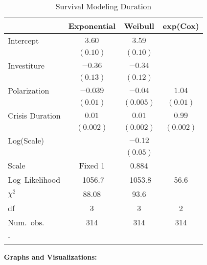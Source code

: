 \documentclass[12pt]{article}
\begin{document}
\begin{table}[h!]
\caption{Survival Modeling Duration}
\begin{center}
\begin{tabular}{l c c c }
\hline
 & Exponential & Weibull & exp(Cox) \\
\hline
Intercept          & $3.60$    & $3.59$    &           \\
                   & $(0.10)$  & $(0.10)$  &           \\
Investiture        & $-0.36$   & $-0.34$   &           \\
                   & $(0.13)$  & $(0.12)$  &           \\
Polarization       & $-0.039$  & $-0.04$   & $1.04$    \\
                   & $(0.01)$  & $(0.005)$ & $(0.01)$  \\
Crisis Duration    & $0.01$    & $0.01$    & $0.99$    \\
                   & $(0.002)$ & $(0.002)$ & $(0.002)$ \\
Log(Scale)         &           & $-0.12$   &           \\
                   &           & $(0.05)$  &           \\

\hline
Scale              & Fixed 1   & 0.884     &           \\
Log\ Likelihood    & -1056.7   & -1053.8   & 56.6      \\
$\chi^2$           & 88.08     & 93.6      &           \\
df                 &  3        &   3       & 2         \\
Num.\ obs.         & 314       & 314       & 314       \\
\hline
\multicolumn{4}{l}{\scriptsize{-}}
\end{tabular}
\end{center}
\end{table}

\clearpage



\textbf{Graphs and Visualizations:}

\end{document}
